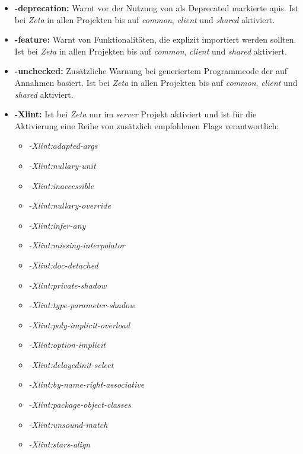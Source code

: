 \begin{itemize}
  \item \textbf{-deprecation:} Warnt vor der Nutzung von als Deprecated markierte \acp{api}. Ist bei \textit{Zeta} in allen Projekten bis auf \textit{common}, \textit{client} und \textit{shared} aktiviert.
  \item \textbf{-feature:} Warnt von Funktionalitäten, die explizit importiert werden sollten. Ist bei \textit{Zeta} in allen Projekten bis auf \textit{common}, \textit{client} und \textit{shared} aktiviert.
  \item \textbf{-unchecked:} Zusätzliche Warnung bei generiertem Programmcode der auf Annahmen basiert. Ist bei \textit{Zeta} in allen Projekten bis auf \textit{common}, \textit{client} und \textit{shared} aktiviert.
  \item \textbf{-Xlint:} Ist bei \textit{Zeta} nur im \textit{server} Projekt aktiviert und ist für die Aktivierung eine Reihe von zusätzlich empfohlenen Flags verantwortlich:

  \begin{multicols}{2}
  \begin{itemize}
    \item \textit{-Xlint:adapted-args}
    \item \textit{-Xlint:nullary-unit}
    \item \textit{-Xlint:inaccessible}
    \item \textit{-Xlint:nullary-override}
    \item \textit{-Xlint:infer-any}
    \item \textit{-Xlint:missing-interpolator}
    \item \textit{-Xlint:doc-detached}
    \item \textit{-Xlint:private-shadow}
    \item \textit{-Xlint:type-parameter-shadow}
    \item \textit{-Xlint:poly-implicit-overload}
    \item \textit{-Xlint:option-implicit}
    \item \textit{-Xlint:delayedinit-select}
    \item \textit{-Xlint:by-name-right-associative}
    \item \textit{-Xlint:package-object-classes}
    \item \textit{-Xlint:unsound-match}
    \item \textit{-Xlint:stars-align}
  \end{itemize}
  \end{multicols}


\end{itemize}
